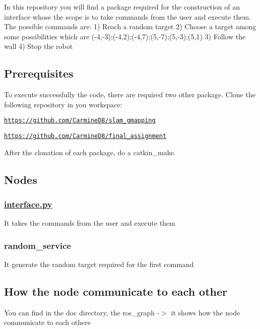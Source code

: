 In this repository you will find a package required for the construction of an interface whose the scope is to take commands from the user and execute them. The possible commands are\+: 1) Reach a random target 2) Choose a target among some possibilities which are (-\/4,-\/3);(-\/4,2);(-\/4,7);(5,-\/7);(5,-\/3);(5,1) 3) Follow the wall 4) Stop the robot

\subsection*{Prerequisites}

To execute successfully the code, there are required two other package. Clone the following repository in you workspace\+:
\begin{DoxyItemize}
\item \href{https://github.com/CarmineD8/slam_gmapping}{\tt https\+://github.\+com/\+Carmine\+D8/slam\+\_\+gmapping}
\item \href{https://github.com/CarmineD8/final_assignment}{\tt https\+://github.\+com/\+Carmine\+D8/final\+\_\+assignment}
\end{DoxyItemize}

After the clonation of each package, do a catkin\+\_\+make.

\subsection*{Nodes}

\subsubsection*{\hyperlink{interface_8py}{interface.\+py}}

It takes the commands from the user and execute them

\subsubsection*{random\+\_\+service}

It generate the random target required for the first command

\subsection*{How the node communicate to each other}

You can find in the doc directory, the ros\+\_\+graph -\/$>$ it shows how the node communicate to each othere

